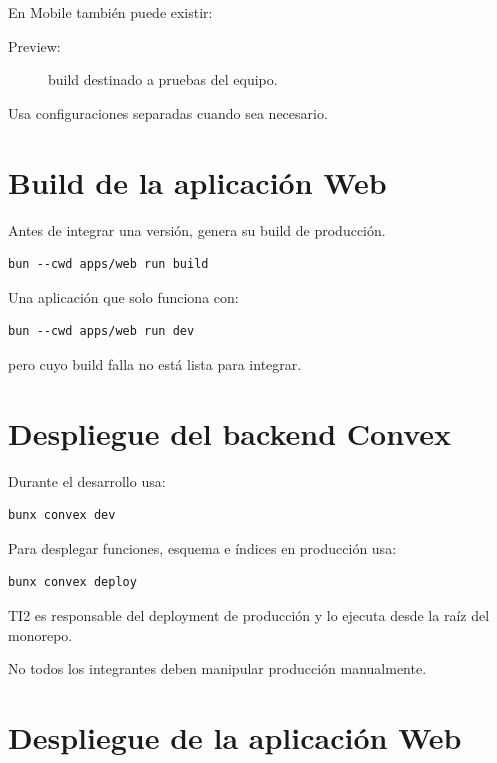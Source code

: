 \documentclass[11pt,a4paper]{article}
\begin{document}
En Mobile también puede existir:

\begin{description}
  \item[Preview:] build destinado a pruebas del equipo.
\end{description}

Usa configuraciones separadas cuando sea necesario.

\section{Build de la aplicación Web}

Antes de integrar una versión, genera su build de producción.

\begin{lstlisting}
bun --cwd apps/web run build
\end{lstlisting}

Una aplicación que solo funciona con:

\begin{lstlisting}
bun --cwd apps/web run dev
\end{lstlisting}

pero cuyo build falla no está lista para integrar.

\section{Despliegue del backend Convex}

Durante el desarrollo usa:

\begin{lstlisting}
bunx convex dev
\end{lstlisting}

Para desplegar funciones, esquema e índices en producción usa:

\begin{lstlisting}
bunx convex deploy
\end{lstlisting}

TI2 es responsable del deployment de producción y lo ejecuta desde la raíz del
monorepo.

No todos los integrantes deben manipular producción manualmente.

\section{Despliegue de la aplicación Web}
\end{document}
